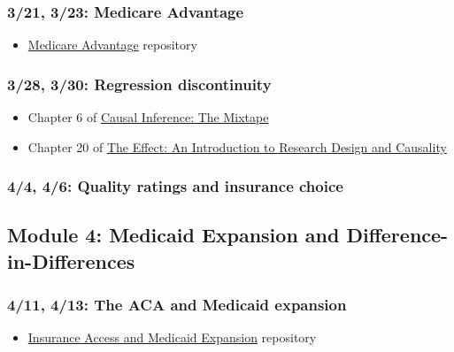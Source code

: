 \documentclass[11pt,]{article}
\providecommand{\tightlist}{%
  \setlength{\itemsep}{0pt}\setlength{\parskip}{0pt}}
\begin{document}
\hypertarget{medicare-advantage}{%
\subsubsection{3/21, 3/23: Medicare
Advantage}\label{medicare-advantage}}

\begin{itemize}
\tightlist
\item
  \href{https://github.com/imccart/Medicare-Advantage}{Medicare
  Advantage} repository
\end{itemize}

\hypertarget{regression-discontinuity}{%
\subsubsection{3/28, 3/30: Regression
discontinuity}\label{regression-discontinuity}}

\begin{itemize}
\tightlist
\item
  Chapter 6 of \href{https://mixtape.scunning.com/}{Causal Inference:
  The Mixtape}
\item
  Chapter 20 of \href{https://theeffectbook.net/}{The Effect: An
  Introduction to Research Design and Causality}
\end{itemize}

\hypertarget{quality-ratings-and-insurance-choice}{%
\subsubsection{4/4, 4/6: Quality ratings and insurance
choice}\label{quality-ratings-and-insurance-choice}}

\hypertarget{module-4-medicaid-expansion-and-difference-in-differences}{%
\subsection{Module 4: Medicaid Expansion and
Difference-in-Differences}\label{module-4-medicaid-expansion-and-difference-in-differences}}

\hypertarget{the-aca-and-medicaid-expansion}{%
\subsubsection{4/11, 4/13: The ACA and Medicaid
expansion}\label{the-aca-and-medicaid-expansion}}

\begin{itemize}
\tightlist
\item
  \href{https://github.com/imccart/Insurance-Access}{Insurance Access
  and Medicaid Expansion} repository
\end{itemize}
\end{document}
